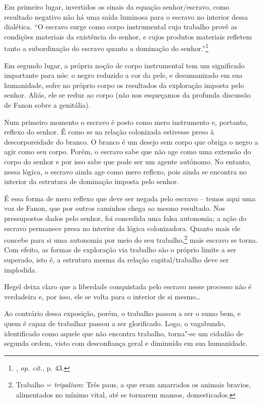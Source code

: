 Em primeiro lugar, invertidos os
sinais da equação senhor/escravo, como resultado negativo não há uma
saída luminosa para o escravo no interior dessa dialética. ``O escravo
surge como corpo instrumental cujo trabalho provê as condições materiais
da existência do senhor, e cujos produtos materiais refletem tanto a
subordinação do escravo quanto a dominação do senhor.''\footnote{,
  \emph{op. cit.}, p. 43.}

Em segundo lugar, a própria noção de corpo instrumental tem um
significado importante para nós: o negro reduzido a cor da pele, e
desumanizado em sua humanidade, sofre no próprio corpo os resultados da
exploração imposta pelo senhor. Aliás, ele se reduz ao corpo (não nos
esqueçamos da profunda discussão de Fanon sobre a genitália).

Num primeiro momento o escravo é posto como mero instrumento e,
portanto, reflexo do senhor. É como se na relação colonizada estivesse
preso à descorporeidade do branco. O branco é um desejo sem corpo que
obriga o negro a agir como seu corpo. Porém, o escravo sabe que não age
como uma extensão do corpo do senhor e por isso sabe que pode ser um
agente autônomo. No entanto, nessa lógica, o escravo ainda age como mero
reflexo, pois ainda se encontra no interior da estrutura de dominação
imposta pelo senhor.

É essa forma de mero reflexo que deve ser negada pelo escravo -- temos
aqui uma voz de Fanon, que por outros caminhos chega ao mesmo resultado.
Nos pressupostos dados pelo senhor, foi concedida uma falsa autonomia; a
ação do escravo permanece presa no interior da lógica colonizadora.
Quanto mais ele concebe para si uma autonomia por meio do seu
trabalho,\footnote{Trabalho = \emph{tripalium}: Três paus, a que eram amarrados os
  animais bravios, alimentados no mínimo vital, até se tornarem mansos,
  domesticados.} mais escravo se torna. Com efeito, as formas de
exploração via trabalho são o próprio limite a ser superado, isto é, a
estrutura mesma da relação capital/trabalho deve ser implodida.

Hegel deixa claro que a liberdade conquistada pelo escravo nesse
processo não é verdadeira e, por isso, ele se volta para o interior de
si mesmo\ldots{}

Ao contrário dessa exposição, porém, o trabalho passou a ser o sumo bem,
e quem é capaz de trabalhar passou a ser glorificado. Logo, o vagabundo,
identificado como aquele que não encontra trabalho, torna"-se um cidadão
de segunda ordem, visto com desconfiança geral e diminuído em sua
humanidade.

